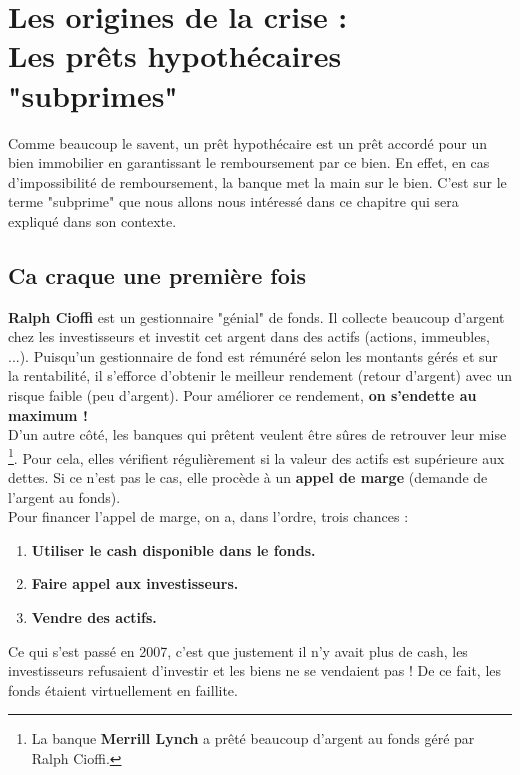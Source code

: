 
\chapter{Les origines de la crise : \\ Les prêts hypothécaires "subprimes"}
Comme beaucoup le savent, un prêt hypothécaire est un prêt accordé pour un bien immobilier en garantissant le remboursement par ce bien. En effet, en cas d'impossibilité de remboursement, la banque met la main sur le bien. C'est sur le terme "subprime" que nous allons nous intéressé dans ce chapitre qui sera expliqué dans son contexte.

\section{Ca craque une première fois}
\textbf{Ralph Cioffi} est un gestionnaire "génial" de fonds. Il collecte beaucoup d'argent chez les investisseurs et investit cet argent dans des actifs (actions, immeubles, ...). Puisqu'un gestionnaire de fond est rémunéré selon les montants gérés et sur la rentabilité, il s'efforce d'obtenir le meilleur rendement (retour d'argent) avec un risque faible (peu d'argent). Pour améliorer ce rendement, \textbf{on s'endette au maximum !} \\
D'un autre côté, les banques qui prêtent veulent être sûres de retrouver leur mise \footnote{La banque \textbf{Merrill Lynch} a prêté beaucoup d'argent au fonds géré par Ralph Cioffi.}. Pour cela, elles vérifient régulièrement si la valeur des actifs est supérieure aux dettes. Si ce n'est pas le cas, elle procède à un \textbf{appel de marge} (demande de l'argent au fonds). \\

Pour financer l'appel de marge, on a, dans l'ordre, trois chances :
\begin{enumerate}
	\item \textbf{Utiliser le cash disponible dans le fonds.}
	\item \textbf{Faire appel aux investisseurs.}
	\item \textbf{Vendre des actifs.}
\end{enumerate}

Ce qui s'est passé en 2007, c'est que justement il n'y avait plus de cash, les investisseurs refusaient d'investir et les biens ne se vendaient pas ! De ce fait, les fonds étaient virtuellement en faillite. \\

